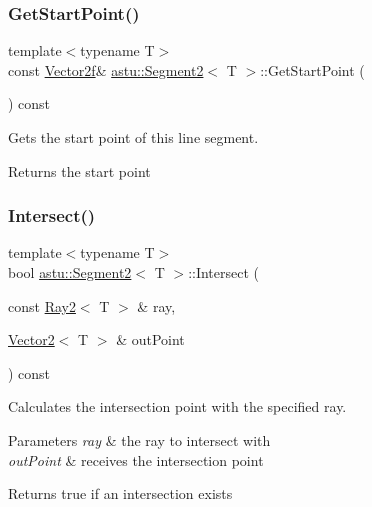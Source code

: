 \subsubsection{\texorpdfstring{Get\+Start\+Point()}{GetStartPoint()}}
{\footnotesize\ttfamily template$<$typename T$>$ \\
const \hyperlink{classastu_1_1Vector2}{Vector2f}\& \hyperlink{classastu_1_1Segment2}{astu\+::\+Segment2}$<$ T $>$\+::Get\+Start\+Point (\begin{DoxyParamCaption}{ }\end{DoxyParamCaption}) const\hspace{0.3cm}{\ttfamily [inline]}}

Gets the start point of this line segment.

\begin{DoxyReturn}{Returns}
the start point 
\end{DoxyReturn}
\mbox{\label{classastu_1_1Segment2_a49888e46b2ea6005c60ecc95ff210cd2}} 
\subsubsection{\texorpdfstring{Intersect()}{Intersect()}\hspace{0.1cm}{\footnotesize\ttfamily [1/3]}}
{\footnotesize\ttfamily template$<$typename T$>$ \\
bool \hyperlink{classastu_1_1Segment2}{astu\+::\+Segment2}$<$ T $>$\+::Intersect (\begin{DoxyParamCaption}\item[{const \hyperlink{classastu_1_1Ray2}{Ray2}$<$ T $>$ \&}]{ray,  }\item[{\hyperlink{classastu_1_1Vector2}{Vector2}$<$ T $>$ \&}]{out\+Point }\end{DoxyParamCaption}) const\hspace{0.3cm}{\ttfamily [inline]}}

Calculates the intersection point with the specified ray.


\begin{DoxyParams}{Parameters}
{\em ray} & the ray to intersect with \\
\hline
{\em out\+Point} & receives the intersection point \\
\hline
\end{DoxyParams}
\begin{DoxyReturn}{Returns}
{\ttfamily true} if an intersection exists 
\end{DoxyReturn}
\mbox{\label{classastu_1_1Segment2_a6be10f8a94f6cfe66d37d8204d8a1123}} 
